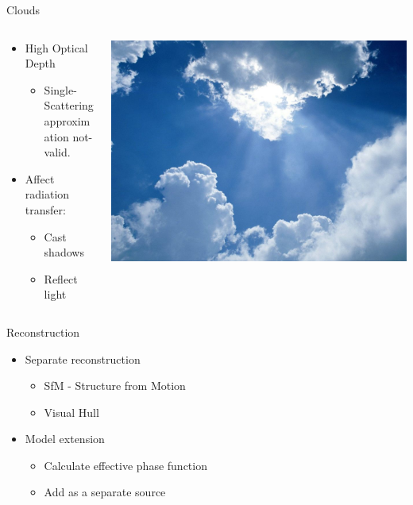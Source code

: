 \documentclass[compress,red,12pt]{beamer}
\begin{document}
\begin{frame}{Clouds}
  \begin{columns}[T]
    \begin{column}{.6\textwidth}
      \begin{itemize}
      \item High Optical Depth
        \begin{itemize}
        \item Single-Scattering approximation not-valid.
        \end{itemize}
      \item Affect radiation transfer:
        \begin{itemize}
        \item Cast shadows
        \item Reflect light
        \end{itemize}
      \end{itemize}
    \end{column}
    \begin{column}{.4\textwidth}
      \includegraphics[height=0.40\textheight]{clouds.jpg}
    \end{column}
  \end{columns}
\end{frame}

\begin{frame}{Reconstruction}
  \begin{itemize}
  \item Separate reconstruction
    \begin{itemize}
    \item SfM - Structure from Motion 
    \item Visual Hull
    \end{itemize}
  \item Model extension
    \begin{itemize}
    \item Calculate effective phase function
    \item Add as a separate source
    \end{itemize}
  \end{itemize}
\end{frame}
\end{document}
